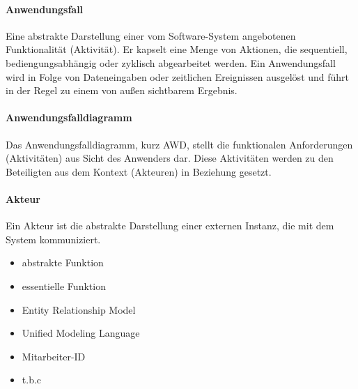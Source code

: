 \paragraph{Anwendungsfall}
Eine abstrakte Darstellung einer vom Software-System angebotenen Funktionalit\"at (Aktivit\"at). Er kapselt eine Menge von Aktionen, die sequentiell, bediengungsabh\"angig oder zyklisch abgearbeitet werden. Ein Anwendungsfall wird in Folge von Dateneingaben oder zeitlichen Ereignissen ausgel\"ost und f\"uhrt in der Regel zu einem von au{\ss}en sichtbarem Ergebnis.

\paragraph{Anwendungsfalldiagramm}
Das Anwendungsfalldiagramm, kurz AWD, stellt die funktionalen Anforderungen (Aktivit\"aten) aus Sicht des Anwenders dar. Diese Aktivit\"aten werden zu den Beteiligten aus dem Kontext (Akteuren) in Beziehung gesetzt.

\paragraph{Akteur}
Ein Akteur ist die abstrakte Darstellung einer externen Instanz, die mit dem System kommuniziert.


\begin{itemize}
	\item abstrakte Funktion
	\item essentielle Funktion
	\item Entity Relationship Model
	\item Unified Modeling Language
	\item Mitarbeiter-ID
	\item t.b.c
\end{itemize}



